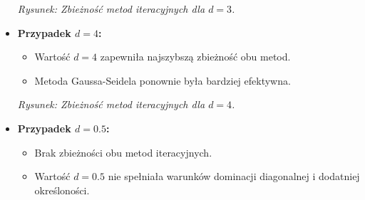 \documentclass[a4paper,12pt]{article}
\begin{document}
\begin{itemize}
    \noindent{}
    \begin{center}
        \textit{Rysunek: Zbieżność metod iteracyjnych dla \(d = 3\).}
    \end{center}

    \item \textbf{Przypadek \(d = 4\):}
    \begin{itemize}
        \item Wartość \(d = 4\) zapewniła najszybszą zbieżność obu metod.
        \item Metoda Gaussa-Seidela ponownie była bardziej efektywna.
    \end{itemize}

    \noindent{}
    \begin{center}
        \textit{Rysunek: Zbieżność metod iteracyjnych dla \(d = 4\).}
    \end{center}

    \item \textbf{Przypadek \(d = 0.5\):}
    \begin{itemize}
        \item Brak zbieżności obu metod iteracyjnych.
        \item Wartość \(d = 0.5\) nie spełniała warunków dominacji diagonalnej i dodatniej określoności.
    \end{itemize}


\end{itemize}
\end{document}
